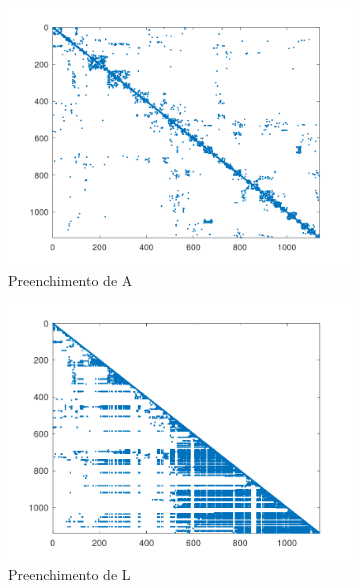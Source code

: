 \documentclass{article}
\begin{document}
\begin{figure}[H]
    \centering
    \begin{subfigure}[b]{0.3\textwidth}
         \centering
         \includegraphics[width=\textwidth]{image/1138_bus_spyA.png}
         \caption{Preenchimento de A}
         \label{fig:bus-spyA}
    \end{subfigure}
    \hfill
    \begin{subfigure}[b]{0.3\textwidth}
         \centering
         \includegraphics[width=\textwidth]{image/1138_bus_spyL.png}
         \caption{Preenchimento de L}
         \label{fig:bus-spyL}
    \end{subfigure}
    \hfill
    \begin{subfigure}[b]{0.3\textwidth}

\end{subfigure}
\end{figure}
\end{document}
